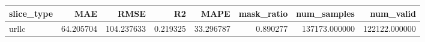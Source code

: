 \begin{tabular}{lrrrrrrr}
\toprule
slice_type & MAE & RMSE & R2 & MAPE & mask_ratio & num_samples & num_valid \\
\midrule
urllc & 64.205704 & 104.237633 & 0.219325 & 33.296787 & 0.890277 & 137173.000000 & 122122.000000 \\
\bottomrule
\end{tabular}
